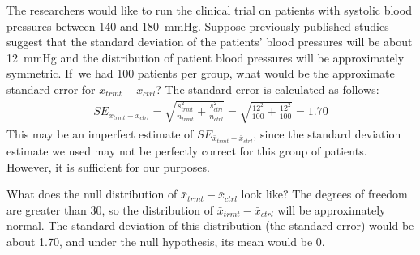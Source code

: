 \begin{examplewrap}
\begin{nexample}{The researchers would like to run the clinical
    trial on patients with systolic blood pressures between 140
    and 180~mmHg.
    Suppose previously published studies suggest that the
    standard deviation of the patients' blood pressures will
    be about 12~mmHg and the distribution of patient blood
    pressures will be approximately symmetric.\footnotemark{}
    If~we had 100 patients per group, what would be the
    approximate standard error for
    $\bar{x}_{trmt} - \bar{x}_{ctrl}$?}
  The standard error is calculated as follows:
  \begin{align*}
  SE_{\bar{x}_{trmt} - \bar{x}_{ctrl}}
    = \sqrt{\frac{s_{trmt}^2}{n_{trmt}} +
        \frac{s_{ctrl}^2}{n_{ctrl}}}
    = \sqrt{\frac{12^2}{100} + \frac{12^2}{100}}
    = 1.70
  \end{align*}
  This may be an imperfect estimate of
  $SE_{\bar{x}_{trmt} - \bar{x}_{ctrl}}$,
  since the standard deviation estimate we used may not
  be perfectly correct for this group of patients.
  However, it is sufficient for our purposes.
\end{nexample}
\end{examplewrap}

\begin{examplewrap}
\begin{nexample}{What does the null distribution of
    $\bar{x}_{trmt} - \bar{x}_{ctrl}$ look like?}
  The degrees of freedom are greater than 30, so the
  distribution of $\bar{x}_{trmt} - \bar{x}_{ctrl}$
  will be approximately normal.
  The standard deviation of this distribution
  (the standard error) would be about 1.70, and under
  the null hypothesis, its mean would be 0.
  \begin{center}
  \end{center}
\end{nexample}
\end{examplewrap}

